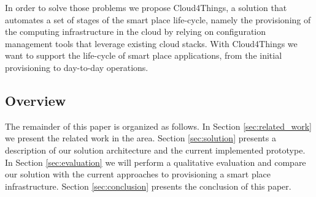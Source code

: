 In order to solve those problems we propose Cloud4Things, a solution that automates a set of stages of the smart
place life-cycle, namely the provisioning of the computing infrastructure in the cloud by relying on configuration
management tools that leverage existing cloud stacks. With Cloud4Things we want to support the life-cycle of smart place
applications, from the initial provisioning to day-to-day operations.

\subsection{Overview}
\label{sub:overview}
The remainder of this paper is organized as follows. In Section \ref{sec:related_work} we
present the related work in the area. Section \ref{sec:solution} presents a description of our
solution architecture and the current implemented prototype. In Section \ref{sec:evaluation}
we will perform a qualitative evaluation and compare our solution with the current approaches to provisioning
a smart place infrastructure. Section \ref{sec:conclusion} presents the conclusion of this paper.
